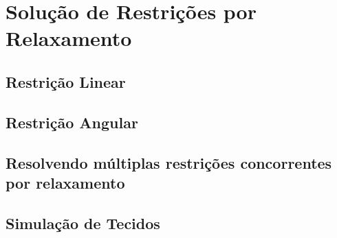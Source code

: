 \chapter{Solução de Restrições por Relaxamento}

\section{Restrição Linear}

\section{Restrição Angular}

\section{Resolvendo múltiplas restrições concorrentes por relaxamento}

\section{Simulação de Tecidos}
